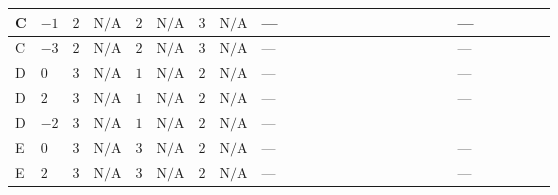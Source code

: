 \documentclass[8pt]{article}
\begin{document}
\begin{landscape}
\begin{longtable}{@{}llcccccc >{\raggedright\arraybackslash}p{0.21\linewidth} >{\raggedright\arraybackslash}p{0.21\linewidth} >{\raggedright\arraybackslash}p{0.21\linewidth}@{}}
\midrule
C & $-1$ & $2$ & $\text{N/A}$ & $2$ & $\text{N/A}$ & $3$ & $\text{N/A}$ & --- & \scriptsize\adjustbox{max width=\linewidth}{$\begin{gathered} +4 {\lambda_{HS_1}^{(1)}} {\lambda_{HS_2}^{(1)}}\end{gathered}$} & --- \\
\midrule
C & $-3$ & $2$ & $\text{N/A}$ & $2$ & $\text{N/A}$ & $3$ & $\text{N/A}$ & --- & \scriptsize\adjustbox{max width=\linewidth}{$\begin{gathered} +4 {\lambda_{HS_1}^{(1)}} {\lambda_{HS_2}^{(1)}}\end{gathered}$} & --- \\
\midrule
D & $0$ & $3$ & $\text{N/A}$ & $1$ & $\text{N/A}$ & $2$ & $\text{N/A}$ & --- & \scriptsize\adjustbox{max width=\linewidth}{$\begin{gathered} +4 {\lambda_{HS_1}^{(1)}} {\lambda_{HS_2}^{(1)}}\end{gathered}$} & --- \\
\midrule
D & $2$ & $3$ & $\text{N/A}$ & $1$ & $\text{N/A}$ & $2$ & $\text{N/A}$ & --- & \scriptsize\adjustbox{max width=\linewidth}{$\begin{gathered} +4 {\lambda_{HS_1}^{(1)}} {\lambda_{HS_2}^{(1)}}\end{gathered}$} & --- \\
\midrule
D & $-2$ & $3$ & $\text{N/A}$ & $1$ & $\text{N/A}$ & $2$ & $\text{N/A}$ & --- & \scriptsize\adjustbox{max width=\linewidth}{$\begin{gathered} +4 {\lambda_{HS_1}^{(1)}} {\lambda_{HS_2}^{(1)}}\end{gathered}$} & \scriptsize\adjustbox{max width=\linewidth}{$\begin{gathered} +12 {\lambda_{X_{2}}} \left({\lambda_{X_{7}}^{(1)}}\right)^{*}\end{gathered}$} \\
\midrule
E & $0$ & $3$ & $\text{N/A}$ & $3$ & $\text{N/A}$ & $2$ & $\text{N/A}$ & --- & \scriptsize\adjustbox{max width=\linewidth}{$\begin{gathered} +4 {\lambda_{HS_1}^{(1)}} {\lambda_{HS_2}^{(1)}}\end{gathered}$} & --- \\
\midrule
E & $2$ & $3$ & $\text{N/A}$ & $3$ & $\text{N/A}$ & $2$ & $\text{N/A}$ & --- & \scriptsize\adjustbox{max width=\linewidth}{$\begin{gathered} +4 {\lambda_{HS_1}^{(1)}} {\lambda_{HS_2}^{(1)}}\end{gathered}$} & --- \\

\end{longtable}
\end{landscape}
\end{document}

